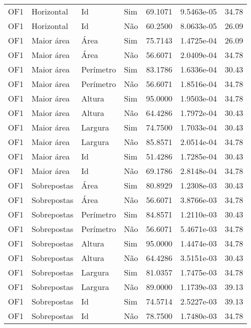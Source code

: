 \begin{tabular}{llllrrr}
    OF1       & Horizontal  & Id        & Sim         & 69.1071      & 9.5463e-05 & 34.78    \\
    OF1       & Horizontal  & Id        & Não         & 60.2500      & 8.0633e-05 & 26.09    \\
    OF1       & Maior área  & Área      & Sim         & 75.7143      & 1.4725e-04 & 26.09    \\
    OF1       & Maior área  & Área      & Não         & 56.6071      & 2.0409e-04 & 34.78    \\
    OF1       & Maior área  & Perímetro & Sim         & 83.1786      & 1.6336e-04 & 30.43    \\
    OF1       & Maior área  & Perímetro & Não         & 56.6071      & 1.8516e-04 & 34.78    \\
    OF1       & Maior área  & Altura    & Sim         & 95.0000      & 1.9503e-04 & 34.78    \\
    OF1       & Maior área  & Altura    & Não         & 64.4286      & 1.7972e-04 & 30.43    \\
    OF1       & Maior área  & Largura   & Sim         & 74.7500      & 1.7033e-04 & 30.43    \\
    OF1       & Maior área  & Largura   & Não         & 85.8571      & 2.0514e-04 & 34.78    \\
    OF1       & Maior área  & Id        & Sim         & 51.4286      & 1.7285e-04 & 30.43    \\
    OF1       & Maior área  & Id        & Não         & 69.1786      & 2.8148e-04 & 34.78    \\
    OF1       & Sobrepostas & Área      & Sim         & 80.8929      & 1.2308e-03 & 30.43    \\
    OF1       & Sobrepostas & Área      & Não         & 56.6071      & 3.8766e-03 & 34.78    \\
    OF1       & Sobrepostas & Perímetro & Sim         & 84.8571      & 1.2110e-03 & 30.43    \\
    OF1       & Sobrepostas & Perímetro & Não         & 56.6071      & 5.4671e-03 & 34.78    \\
    OF1       & Sobrepostas & Altura    & Sim         & 95.0000      & 1.4474e-03 & 34.78    \\
    OF1       & Sobrepostas & Altura    & Não         & 64.4286      & 3.5151e-03 & 30.43    \\
    OF1       & Sobrepostas & Largura   & Sim         & 81.0357      & 1.7475e-03 & 34.78    \\
    OF1       & Sobrepostas & Largura   & Não         & 89.0000      & 1.1739e-03 & 39.13    \\
    OF1       & Sobrepostas & Id        & Sim         & 74.5714      & 2.5227e-03 & 39.13    \\
    OF1       & Sobrepostas & Id        & Não         & 78.7500      & 1.7480e-03 & 34.78    \\
    \hline
\end{tabular}